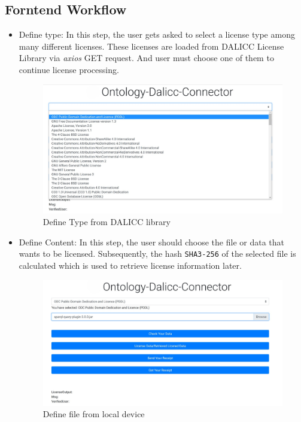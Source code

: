 \subsection{Forntend Workflow}
\begin{itemize}
	\item Define type:
	In this step, the user gets asked to select a license type among many different licenses. These licenses are loaded from DALICC License Library via \textit{axios} GET request. And user must choose one of them to continue license processing.
 \begin{center}
	\begin{figure}[htb!]
		
		\begin{minipage}{0.45\linewidth}
			\centering
			\includegraphics[width=1.95\textwidth]{images/chap03_selectType.jpg}
		\end{minipage}
		\caption[Define Type from DALICC library]{Define Type from DALICC library}
		
	\end{figure}
	
\end{center}
	\item Define Content:
	In this step, the user should choose the file or data that wants to be licensed. Subsequently, the hash \texttt{SHA3-256} of the selected file is calculated which is used to retrieve license information later.
 \begin{center}
	\begin{figure}[htb!]
		
		\begin{minipage}{0.45\linewidth}
			\centering
			\includegraphics[width=1.95\textwidth]{images/chap03_selectFile.jpg}
		\end{minipage}
		\caption[Define file from local device]{Define file from local device}
		

\end{figure}
\end{center}
\end{itemize}
